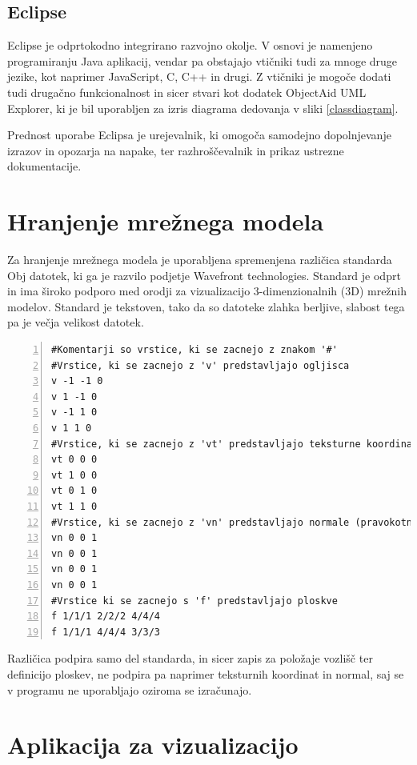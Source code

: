 \documentclass[a4paper, 12pt]{book}
\begin{document}
\subsection*{Eclipse}

Eclipse je odprtokodno integrirano razvojno okolje. V osnovi je namenjeno programiranju Java aplikacij, vendar pa obstajajo vtičniki tudi za mnoge druge jezike, kot naprimer JavaScript, C, C++ in drugi. Z vtičniki je mogoče dodati tudi drugačno funkcionalnost in sicer stvari kot dodatek ObjectAid UML Explorer\cite{objectaid}, ki je bil uporabljen za izris diagrama dedovanja v sliki \ref{classdiagram}.

Prednost uporabe Eclipsa je urejevalnik, ki omogoča samodejno dopolnjevanje izrazov in opozarja na napake, ter razhroščevalnik in prikaz ustrezne dokumentacije. 

\section{Hranjenje mrežnega modela}

Za hranjenje mrežnega modela je uporabljena spremenjena različica standarda Obj datotek\cite{obj}, ki ga je razvilo podjetje Wavefront technologies. Standard je odprt in ima široko podporo med orodji za vizualizacijo 3-dimenzionalnih (3D) mrežnih modelov. Standard je tekstoven, tako da so datoteke zlahka berljive, slabost tega pa je večja velikost datotek.
\renewcommand{\lstlistingname}{Datoteka}
\renewcommand{\lstlistlistingname}{Seznam datotek}
\footnotesize{
\begin{lstlisting}[captionpos=b, frame=single, caption={Primer Obj datoteke, ki predstavlja kvadrat.}, breaklines=true, firstline=1, numbers=left]
#Komentarji so vrstice, ki se zacnejo z znakom '#'
#Vrstice, ki se zacnejo z 'v' predstavljajo ogljisca 
v -1 -1 0
v 1 -1 0
v -1 1 0
v 1 1 0
#Vrstice, ki se zacnejo z 'vt' predstavljajo teksturne koordinate
vt 0 0 0
vt 1 0 0
vt 0 1 0
vt 1 1 0
#Vrstice, ki se zacnejo z 'vn' predstavljajo normale (pravokotnice?)
vn 0 0 1
vn 0 0 1
vn 0 0 1
vn 0 0 1
#Vrstice ki se zacnejo s 'f' predstavljajo ploskve
f 1/1/1 2/2/2 4/4/4
f 1/1/1 4/4/4 3/3/3
\end{lstlisting}}

Različica podpira samo del standarda, in sicer zapis za položaje vozlišč ter definicijo ploskev, ne podpira pa naprimer teksturnih koordinat in normal, saj se v programu ne uporabljajo oziroma se izračunajo.

\section{Aplikacija za vizualizacijo}
\end{document}
